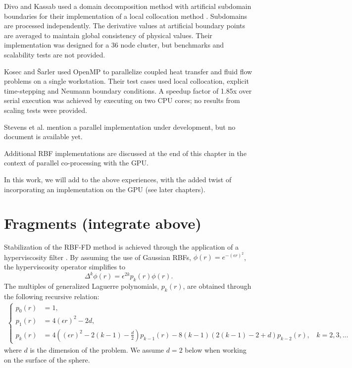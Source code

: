 \documentclass[11pt]{report}
\begin{document}
{Divo and Kassab \cite{Divo2007} used a domain decomposition method with artificial 
subdomain boundaries for their implementation of a local collocation method \cite{Divo2007}. 
Subdomains are processed independently. The derivative values 
at artificial boundary points are averaged to maintain global consistency of physical values. Their implementation 
was designed for a 36 node cluster, but benchmarks and scalability tests are not provided.


Kosec and \v{S}arler \cite{Kosec2008} used OpenMP to parallelize coupled heat transfer 
and fluid flow problems on a single workstation. 
Their test cases used local collocation, explicit time-stepping and Neumann boundary conditions. A speedup 
factor of 1.85x over serial execution was achieved by executing on two CPU cores; no 
results from scaling tests were provided. 

Stevens et al. \cite{Stevens2009a} mention a parallel implementation under development, but no document is available yet. 

Additional RBF implementations are discussed at the end of this chapter in the context of parallel co-processing with the GPU. 

In this work, we will add to the above experiences, with the added twist of incorporating an implementation on the GPU (see later chapters). 


\section{Fragments (integrate above)}

Stabilization of the RBF-FD method is achieved through the application of a hyperviscosity filter \cite{Fornberg2011b}. By assuming the use of Gaussian RBFs, $\phi(r) = e^{-(\epsilon r)^2}$, the hyperviscosity operator simplifies to
\begin{equation}
\Delta^{k}\phi(r) = \epsilon^{2k} p_k(r) \phi(r).
\label{eqn:gaussian_hv}
\end{equation}
The multiples of generalized Laguerre polynomials, $p_k(r)$, are obtained through the following recursive relation:
\begin{align*}
\begin{cases} 
p_0(r) &=1, \\
p_1(r) &= 4(\epsilon r)^2 - 2d, \\
p_k(r) &= 4((\epsilon r)^2 - 2(k-1) - \frac{d}{2})  p_{k-1}(r) - 8(k-1)(2(k-1) - 2 + d) p_{k-2}(r), \ \ \ \ k = 2, 3, ...
\end{cases}
\end{align*}
where $d$ is the dimension of the problem. We assume $d=2$ below when working on the surface of the sphere.


}
\end{document}
